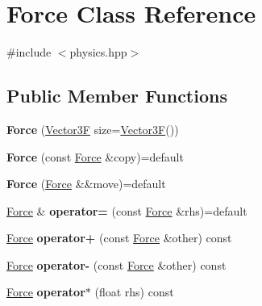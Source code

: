 \hypertarget{class_force}{}\section{Force Class Reference}
\label{class_force}


{\ttfamily \#include $<$physics.\+hpp$>$}

\subsection*{Public Member Functions}
\begin{DoxyCompactItemize}
\item 
\mbox{\label{class_force_ac2deda6f27a8b0fab174043d9bfe7519}} 
{\bfseries Force} (\mbox{\hyperlink{class_vector3}{Vector3F}} size=\mbox{\hyperlink{class_vector3}{Vector3F}}())
\item 
\mbox{\label{class_force_a9538d23e4b470dd0bb48c9034aee9143}} 
{\bfseries Force} (const \mbox{\hyperlink{class_force}{Force}} \&copy)=default
\item 
\mbox{\label{class_force_a1bc30b4316742b1a2366a83608a43281}} 
{\bfseries Force} (\mbox{\hyperlink{class_force}{Force}} \&\&move)=default
\item 
\mbox{\label{class_force_a8dd2214f672ba69991ba8ceff22faaf1}} 
\mbox{\hyperlink{class_force}{Force}} \& {\bfseries operator=} (const \mbox{\hyperlink{class_force}{Force}} \&rhs)=default
\item 
\mbox{\label{class_force_a419d260e59ceefcc28e562ceff74eb63}} 
\mbox{\hyperlink{class_force}{Force}} {\bfseries operator+} (const \mbox{\hyperlink{class_force}{Force}} \&other) const
\item 
\mbox{\label{class_force_a2a0c854e06f30da370ce3d1914f667fc}} 
\mbox{\hyperlink{class_force}{Force}} {\bfseries operator-\/} (const \mbox{\hyperlink{class_force}{Force}} \&other) const
\item 
\mbox{\label{class_force_acdbb93269b4f86311eb0b2209011c0aa}} 
\mbox{\hyperlink{class_force}{Force}} {\bfseries operator$\ast$} (float rhs) const
\item 
\mbox{\label{class_force_a844ecf855e7a874b9fc7dc1f28608420}} 

\end{DoxyCompactItemize}
